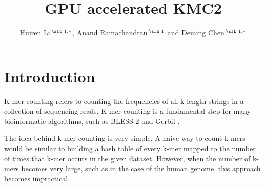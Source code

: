 \documentclass{bioinfo}
\begin{document}

\title[short Title]{GPU accelerated KMC2}
\author[]{Huiren Li\,$^{\text{\sfb 1,}*}$, Anand Ramachandran\,$^{\text{\sfb 1}}$ and
Deming Chen\,$^{\text{\sfb 1,}*}$}
\address{$^{\text{\sf 1}}$Department of Electrical and Computer Engineering, University of
Illinois at Urbana-Champaign, Urbana, IL 61801, USA}

\corresp{}




\maketitle

\section{Introduction}

K-mer counting refers to counting the frequencies of all k-length strings in a collection
of sequencing reads.
K-mer counting is a fundamental step for many bioinformatic algorithms, such as BLESS 2
\citep{Heo16} and Gerbil \citep{Mar17}.

The idea behind k-mer counting is very simple. A naive way to count k-mers would be similar 
to building a hash table of every k-mer mapped to the number of times that k-mer occurs 
in the given dataset. However, when the number of k-mers becomes very large, such as in 
the case of the human genome, this approach becomes impractical.
\end{document}

